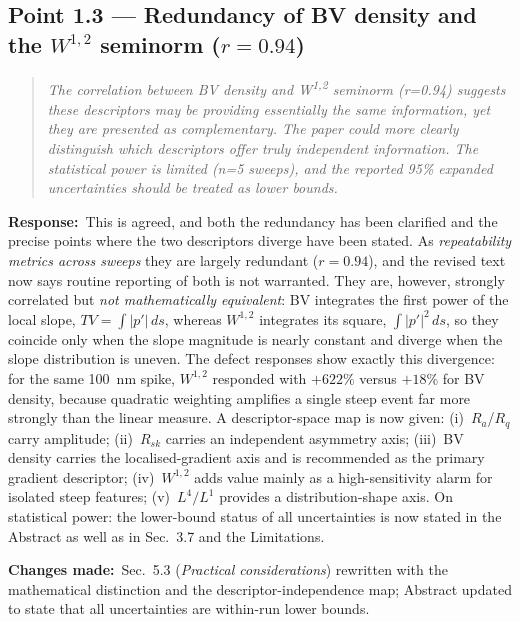 \documentclass[11pt,a4paper]{article}
\newenvironment{reviewercomment}%
{\par\medskip\noindent\begin{quotation}\itshape\color{black!70}}%
{\end{quotation}\medskip}
\newcommand{\response}{\par\noindent\textbf{Response:}\ }
\newcommand{\changes}{\par\noindent\textbf{Changes made:}\ }
\begin{document}
\subsection*{Point 1.3 --- Redundancy of BV density and the $W^{1,2}$ seminorm ($r = 0.94$)}
\begin{reviewercomment}
The correlation between BV density and W\textsuperscript{1,2} seminorm (r=0.94) suggests these descriptors may be providing essentially the same information, yet they are presented as complementary. The paper could more clearly distinguish which descriptors offer truly independent information. The statistical power is limited (n=5 sweeps), and the reported 95\% expanded uncertainties should be treated as lower bounds.
\end{reviewercomment}
\response This is agreed, and both the redundancy has been clarified and the precise points where the two descriptors diverge have been stated. As \emph{repeatability metrics across sweeps} they are largely redundant ($r=0.94$), and the revised text now says routine reporting of both is not warranted. They are, however, strongly correlated but \emph{not mathematically equivalent}: BV integrates the first power of the local slope, $TV=\int|p'|\,ds$, whereas $W^{1,2}$ integrates its square, $\int|p'|^2\,ds$, so they coincide only when the slope magnitude is nearly constant and diverge when the slope distribution is uneven. The defect responses show exactly this divergence: for the same 100~nm spike, $W^{1,2}$ responded with $+622\%$ versus $+18\%$ for BV density, because quadratic weighting amplifies a single steep event far more strongly than the linear measure. A descriptor-space map is now given: (i)~$R_a$/$R_q$ carry amplitude; (ii)~$R_{sk}$ carries an independent asymmetry axis; (iii)~BV density carries the localised-gradient axis and is recommended as the primary gradient descriptor; (iv)~$W^{1,2}$ adds value mainly as a high-sensitivity alarm for isolated steep features; (v)~$L^4/L^1$ provides a distribution-shape axis. On statistical power: the lower-bound status of all uncertainties is now stated in the Abstract as well as in Sec.~3.7 and the Limitations.
\changes Sec.~5.3 (\emph{Practical considerations}) rewritten with the mathematical distinction and the descriptor-independence map; Abstract updated to state that all uncertainties are within-run lower bounds.
\end{document}
